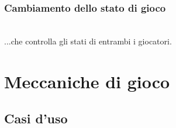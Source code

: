 \documentclass[a4paper,11pt]{article}
\begin{document}
\subsubsection{Cambiamento dello stato di gioco}
\noindent{}\\...che controlla gli stati di entrambi i giocatori.
\newpage

\section{Meccaniche di gioco}
\subsection{Casi d'uso}
\noindent{}
\end{document}
